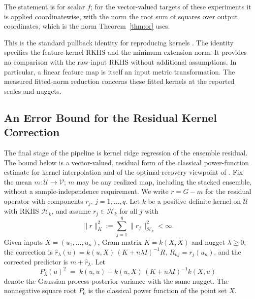 \documentclass[twoside,11pt]{article}
\begin{document}
The statement is for scalar $f$; for the vector-valued targets of these
experiments it is applied coordinatewise, with the norm the root sum of squares
over output coordinates, which is the norm Theorem~\ref{thm:or} uses.

This is the standard pullback identity for
reproducing kernels \citep{saitoh1997integral,paulsen2016introduction}. The identity specifies the feature-kernel RKHS and the minimum extension norm. It provides no comparison with the raw-input RKHS without additional assumptions. In particular, a linear feature map is itself an input metric transformation. The measured fitted-norm reduction concerns these fitted kernels at the reported scales and nuggets.

\subsection{An Error Bound for the Residual Kernel Correction}
\label{sec:theory-or}

The final stage of the pipeline is kernel ridge regression of the ensemble
residual. The bound below is a vector-valued, residual form of the classical
power-function estimate for kernel interpolation
\citep{wendland2004scattered} and of the optimal-recovery viewpoint of
\citet{owhadi2019operator}. Fix the mean
$m:\mathcal U\to\mathcal V$; $m$ may be any realized map, including
the stacked ensemble, without a sample-independence requirement. We
write $r=G-m$ for the residual operator with components $r_j$, $j=1,\dots,q$. Let $k$ be a positive definite kernel on $\mathcal U$ with
RKHS $\mathcal H_k$, and assume $r_j\in\mathcal H_k$ for all $j$ with
\[
\|r\|_K^2:=\sum_{j=1}^q\|r_j\|_{\mathcal H_k}^2<\infty .
\]
Given inputs $X=(u_1,\dots,u_n)$, Gram matrix $K=k(X,X)$ and nugget
$\lambda\ge 0$, the correction is
$\widehat r_\lambda(u)=k(u,X)\,(K+n\lambda I)^{-1}R$, $R_{nj}=r_j(u_n)$, and the
corrected predictor is $m+\widehat r_\lambda$. Let
\begin{equation}\label{eq:power}
P_\lambda(u)^2\;=\;k(u,u)-k(u,X)\,(K+n\lambda I)^{-1}k(X,u)
\end{equation}
denote the Gaussian process posterior variance with the same nugget.
The nonnegative square root $P_0$ is the classical power function of the
point set $X$.
\end{document}
